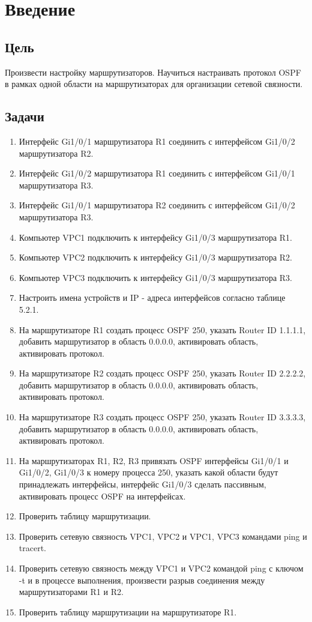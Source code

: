 \chapter{Введение}

\section{Цель}  

Произвести настройку маршрутизаторов.
Научиться настраивать протокол OSPF в рамках одной области на
маршрутизаторах для организации сетевой связности.
\section{Задачи}

\begin{enumerate}
\item Интерфейс Gi1/0/1 маршрутизатора R1 соединить с интерфейсом Gi1/0/2
маршрутизатора R2.
\item Интерфейс Gi1/0/2 маршрутизатора R1 соединить с интерфейсом Gi1/0/1
маршрутизатора R3.
\item Интерфейс Gi1/0/1 маршрутизатора R2 соединить с интерфейсом Gi1/0/2
маршрутизатора R3.
\item Компьютер VPC1 подключить к интерфейсу Gi1/0/3 маршрутизатора R1.
\item Компьютер VPC2 подключить к интерфейсу Gi1/0/3 маршрутизатора R2.
\item Компьютер VPC3 подключить к интерфейсу Gi1/0/3 маршрутизатора R3.
\item Настроить имена устройств и IP - адреса интерфейсов согласно таблице
5.2.1.
\item На маршрутизаторе R1 создать процесс OSPF 250, указать Router ID 1.1.1.1,
добавить маршрутизатор в область 0.0.0.0, активировать область, активировать
протокол.
\item На маршрутизаторе R2 создать процесс OSPF 250, указать Router ID 2.2.2.2,
добавить маршрутизатор в область 0.0.0.0, активировать область, активировать
протокол.
\item На маршрутизаторе R3 создать процесс OSPF 250, указать Router ID 3.3.3.3,
добавить маршрутизатор в область 0.0.0.0, активировать область, активировать
протокол.
\item На маршрутизаторах R1, R2, R3 привязать OSPF интерфейсы Gi1/0/1 и
Gi1/0/2, Gi1/0/3 к номеру процесса 250, указать какой области будут принадлежать
интерфейсы, интерфейс Gi1/0/3 сделать пассивным, активировать процесс OSPF
на интерфейсах.
\item Проверить таблицу маршрутизации.
\item Проверить сетевую связность VPC1, VPC2 и VPC1, VPC3 командами ping и
tracert.
\item Проверить сетевую связность между VPC1 и VPC2 командой ping с ключом -t
и в процессе выполнения, произвести разрыв соединения между
маршрутизаторами R1 и R2.
\item Проверить таблицу маршрутизации на маршрутизаторе R1.
\end{enumerate}

